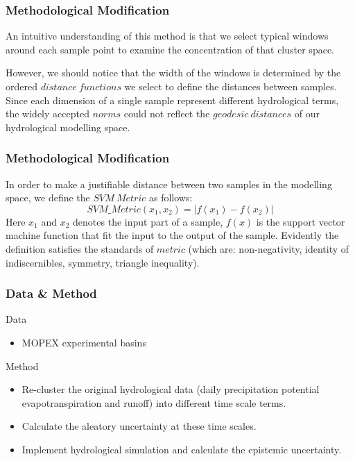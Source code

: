 \documentclass{beamer}
\begin{document}
\begin{CJK}{UTF8}{gkai}
\begin{frame}
\end{frame}

\begin{frame}
\frametitle{Methodological Modification}
An intuitive understanding of this method is that we select typical windows around each sample point to examine the concentration of that cluster space.

However, we should notice that the width of the windows is determined by the ordered $distance~functions$ we select to define the distances between samples. Since each dimension of a single sample represent different hydrological terms, the widely accepted 
$norms$ could not reflect the $geodesic      ~distances$ of our hydrological modelling space. 
 
\end{frame}


\begin{frame}
\frametitle{Methodological Modification}
In order to make a justifiable distance between two samples in the modelling space, we define the $SVM~Metric$ as follows:
\begin{equation*}
SVM\_Metric(x_1,x_2)=|f(x_1)-f(x_2)|
\end{equation*}
Here $x_1$ and $x_2$ denotes the input part of a sample, $f(x)$ is the support vector machine function that fit the input to the output of the sample.   
Evidently the definition satisfies the standards of $metric$ (which are: non-negativity, identity of indiscernibles, symmetry, triangle inequality).
\end{frame}




\begin{frame}
\frametitle{Data \& Method}
 Data 
 \begin{itemize}
 \item MOPEX experimental basins 
 \end{itemize}
 
 Method 
 \begin{itemize}
 \item Re-cluster the original hydrological data (daily precipitation potential evapotranspiration and runoff) into different time scale terms.
 \item Calculate the  aleatory uncertainty at these time scales.
 \item Implement hydrological simulation and calculate the epistemic uncertainty.
 \end{itemize}
\end{frame}



\end{CJK}
\end{document}
